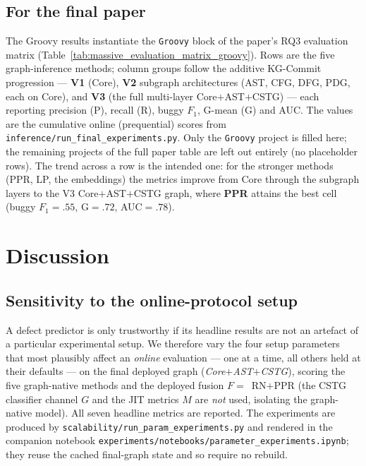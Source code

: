 \documentclass[11pt,a4paper]{article}
\newcommand{\code}[1]{\texttt{#1}}
\begin{document}
	\subsection{For the final paper}\label{sec:v4-paper}
	The Groovy results instantiate the \texttt{Groovy} block of the paper's RQ3
	evaluation matrix (Table~\ref{tab:massive_evaluation_matrix_groovy}). Rows are the
	five graph-inference methods; column groups follow the additive KG-Commit
	progression --- \textbf{V1} (Core), \textbf{V2} subgraph architectures
	(AST, CFG, DFG, PDG, each on Core), and \textbf{V3} (the full multi-layer
	Core$+$AST$+$CSTG) --- each reporting precision (P), recall (R), buggy $F_1$,
	G-mean (G) and AUC. The values are the cumulative online (prequential) scores
	from \code{inference/run\_final\_experiments.py}. Only the \texttt{Groovy} project
	is filled here; the remaining projects of the full paper table are left out
	entirely (no placeholder rows). The trend across a row is the intended one: for
	the stronger methods (PPR, LP, the embeddings) the metrics improve from Core
	through the subgraph layers to the V3 Core$+$AST$+$CSTG graph, where
	\textbf{PPR} attains the best cell (buggy $F_1=.55$, G$=.72$, AUC$=.78$).

	

	\section{Discussion}\label{sec:discussion}
	\subsection{Sensitivity to the online-protocol setup}\label{sec:disc-params}
	A defect predictor is only trustworthy if its headline results are not an
	artefact of a particular experimental setup. We therefore vary the four setup
	parameters that most plausibly affect an \emph{online} evaluation --- one at a
	time, all others held at their defaults --- on the final deployed graph
	(\emph{Core$+$AST$+$CSTG}), scoring the five graph-native methods and the deployed
	fusion $F=$~RN$+$PPR (the CSTG classifier channel $G$ and the JIT metrics $M$ are
	\emph{not} used, isolating the graph-native model). All seven headline metrics are
	reported. The experiments are produced by
	\code{scalability/run\_param\_experiments.py} and rendered in the companion
	notebook \code{experiments/notebooks/parameter\_experiments.ipynb}; they reuse the
	cached final-graph state and so require no rebuild.
\end{document}
